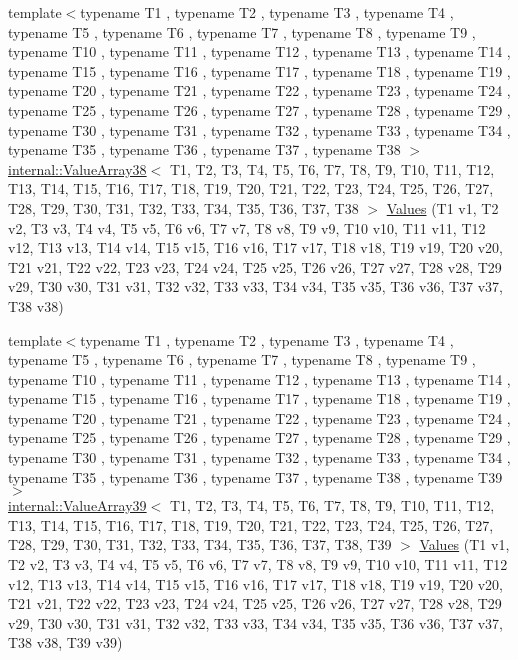\begin{DoxyCompactItemize}
{\footnotesize template$<$typename T1 , typename T2 , typename T3 , typename T4 , typename T5 , typename T6 , typename T7 , typename T8 , typename T9 , typename T10 , typename T11 , typename T12 , typename T13 , typename T14 , typename T15 , typename T16 , typename T17 , typename T18 , typename T19 , typename T20 , typename T21 , typename T22 , typename T23 , typename T24 , typename T25 , typename T26 , typename T27 , typename T28 , typename T29 , typename T30 , typename T31 , typename T32 , typename T33 , typename T34 , typename T35 , typename T36 , typename T37 , typename T38 $>$ }\\\mbox{\hyperlink{classtesting_1_1internal_1_1_value_array38}{internal\+::\+Value\+Array38}}$<$ T1, T2, T3, T4, T5, T6, T7, T8, T9, T10, T11, T12, T13, T14, T15, T16, T17, T18, T19, T20, T21, T22, T23, T24, T25, T26, T27, T28, T29, T30, T31, T32, T33, T34, T35, T36, T37, T38 $>$ \mbox{\hyperlink{namespacetesting_aabc33ee31d17eb0b0bed3401d62266d9}{Values}} (T1 v1, T2 v2, T3 v3, T4 v4, T5 v5, T6 v6, T7 v7, T8 v8, T9 v9, T10 v10, T11 v11, T12 v12, T13 v13, T14 v14, T15 v15, T16 v16, T17 v17, T18 v18, T19 v19, T20 v20, T21 v21, T22 v22, T23 v23, T24 v24, T25 v25, T26 v26, T27 v27, T28 v28, T29 v29, T30 v30, T31 v31, T32 v32, T33 v33, T34 v34, T35 v35, T36 v36, T37 v37, T38 v38)
\item 
{\footnotesize template$<$typename T1 , typename T2 , typename T3 , typename T4 , typename T5 , typename T6 , typename T7 , typename T8 , typename T9 , typename T10 , typename T11 , typename T12 , typename T13 , typename T14 , typename T15 , typename T16 , typename T17 , typename T18 , typename T19 , typename T20 , typename T21 , typename T22 , typename T23 , typename T24 , typename T25 , typename T26 , typename T27 , typename T28 , typename T29 , typename T30 , typename T31 , typename T32 , typename T33 , typename T34 , typename T35 , typename T36 , typename T37 , typename T38 , typename T39 $>$ }\\\mbox{\hyperlink{classtesting_1_1internal_1_1_value_array39}{internal\+::\+Value\+Array39}}$<$ T1, T2, T3, T4, T5, T6, T7, T8, T9, T10, T11, T12, T13, T14, T15, T16, T17, T18, T19, T20, T21, T22, T23, T24, T25, T26, T27, T28, T29, T30, T31, T32, T33, T34, T35, T36, T37, T38, T39 $>$ \mbox{\hyperlink{namespacetesting_aba3a6a2dcb9660c6ccb1d867c7a137ee}{Values}} (T1 v1, T2 v2, T3 v3, T4 v4, T5 v5, T6 v6, T7 v7, T8 v8, T9 v9, T10 v10, T11 v11, T12 v12, T13 v13, T14 v14, T15 v15, T16 v16, T17 v17, T18 v18, T19 v19, T20 v20, T21 v21, T22 v22, T23 v23, T24 v24, T25 v25, T26 v26, T27 v27, T28 v28, T29 v29, T30 v30, T31 v31, T32 v32, T33 v33, T34 v34, T35 v35, T36 v36, T37 v37, T38 v38, T39 v39)

\end{DoxyCompactItemize}
